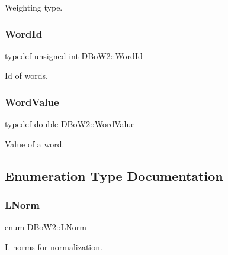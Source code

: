 Weighting type. 

\mbox{\label{namespace_d_bo_w2_ab1a0d3283b2d4690a383372ed20bfeb5}} 
\subsubsection{\texorpdfstring{Word\+Id}{WordId}}
{\footnotesize\ttfamily typedef unsigned int \mbox{\hyperlink{namespace_d_bo_w2_ab1a0d3283b2d4690a383372ed20bfeb5}{D\+Bo\+W2\+::\+Word\+Id}}}



Id of words. 

\mbox{\label{namespace_d_bo_w2_a55fcd7333e591a38e96b91f41bc182f6}} 
\subsubsection{\texorpdfstring{Word\+Value}{WordValue}}
{\footnotesize\ttfamily typedef double \mbox{\hyperlink{namespace_d_bo_w2_a55fcd7333e591a38e96b91f41bc182f6}{D\+Bo\+W2\+::\+Word\+Value}}}



Value of a word. 



\subsection{Enumeration Type Documentation}
\mbox{\label{namespace_d_bo_w2_a53e9e0bcfc25c861815e413a7cf3fa51}} 
\subsubsection{\texorpdfstring{L\+Norm}{LNorm}}
{\footnotesize\ttfamily enum \mbox{\hyperlink{namespace_d_bo_w2_a53e9e0bcfc25c861815e413a7cf3fa51}{D\+Bo\+W2\+::\+L\+Norm}}}



L-\/norms for normalization. 


